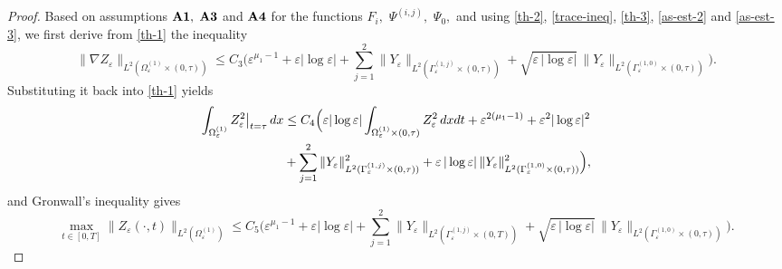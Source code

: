 \documentclass[reqno]{amsart}            %
\numberwithin{equation}{section}
\begin{document}
\begin{proof}
		Based on assumptions ${\bf A1},$ ${\bf A3}$ and ${\bf A4}$ for the functions $F_i,$ $\Psi^{(i,j)},$ $\Psi_0,$ and using \eqref{th-2}, \eqref{trace-ineq}, \eqref{th-3}, \eqref{as-est-2} and \eqref{as-est-3}, we first derive from \eqref{th-1} the  inequality 
		\begin{equation}\label{th-4}
			\|\nabla Z_\varepsilon\|_{L^2(\Omega_\varepsilon^{(1)}\times(0,\tau))} \le C_3 \Big(\varepsilon^{\mu_1 -1} + \varepsilon |\log\varepsilon| + \sum_{j=1}^{2} \|Y_\varepsilon\|_{L^2(\Gamma_\varepsilon^{(1,j)}\times (0,\tau))} +
			\sqrt{\varepsilon \, |\log\varepsilon|} \,\|Y_\varepsilon\|_{L^2(\Gamma_\varepsilon^{(1,0)}\times (0,\tau))}
			\Big).
		\end{equation}
		Substituting it back into \eqref{th-1} yields  
		\begin{align*}%
			\int_{\Omega_\varepsilon^{(1)}}Z_\varepsilon^2\big|_{t=\tau}\, dx  & \le C_4 \Big(
			\varepsilon |\log\varepsilon| \int_{\Omega_\varepsilon^{(1)}\times(0,\tau)} Z^2_\varepsilon \, dxdt 
			+ 
			\varepsilon^{2(\mu_1 -1)} + \varepsilon^2 |\log\varepsilon|^2 \notag
			\\
			&  + \sum_{j=1}^{2} \|Y_\varepsilon\|^2_{L^2(\Gamma_\varepsilon^{(1,j)}\times (0,\tau))} + \varepsilon \, |\log\varepsilon| \,\|Y_\varepsilon\|^2_{L^2(\Gamma_\varepsilon^{(1,0)}\times (0,\tau))}\Big),
		\end{align*}
		and Gronwall's inequality gives 
		\begin{equation}\label{th-5+}
			\max_{t\in[0,T]}\|Z_\varepsilon(\cdot,t)\|_{L^2(\Omega_\varepsilon^{(1)})} \le C_5 \Big(
			\varepsilon^{\mu_1 -1} + \varepsilon |\log\varepsilon| 
			+ \sum_{j=1}^{2} \|Y_\varepsilon\|_{L^2(\Gamma_\varepsilon^{(1,j)}\times (0,T))} + \sqrt{\varepsilon \, |\log\varepsilon|} \,\|Y_\varepsilon\|_{L^2(\Gamma_\varepsilon^{(1,0)}\times (0,\tau))}
			\Big).
		\end{equation}
		
		
		

\end{proof}
\end{document}
